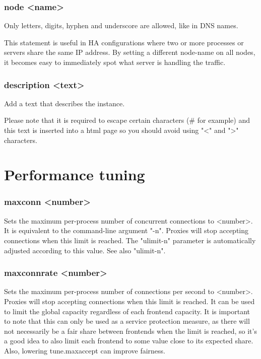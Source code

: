 \subsubsection[node]{node <name>}
  Only letters, digits, hyphen and underscore are allowed, like in DNS names.

  This statement is useful in HA configurations where two or more processes or
  servers share the same IP address. By setting a different node-name on all
  nodes, it becomes easy to immediately spot what server is handling the
  traffic.

\subsubsection[description]{description <text>}
  Add a text that describes the instance.

  Please note that it is required to escape certain characters (\# for example)
  and this text is inserted into a html page so you should avoid using
  "<" and ">" characters.

\section{Performance tuning}

\subsubsection[maxconn]{maxconn <number>}
  Sets the maximum per-process number of concurrent connections to <number>. It
  is equivalent to the command-line argument "-n". Proxies will stop accepting
  connections when this limit is reached. The "ulimit-n" parameter is
  automatically adjusted according to this value. See also "ulimit-n".

\subsubsection[maxconnrate]{maxconnrate <number>}
  Sets the maximum per-process number of connections per second to <number>.
  Proxies will stop accepting connections when this limit is reached. It can be
  used to limit the global capacity regardless of each frontend capacity. It is
  important to note that this can only be used as a service protection measure,
  as there will not necessarily be a fair share between frontends when the
  limit is reached, so it's a good idea to also limit each frontend to some
  value close to its expected share. Also, lowering tune.maxaccept can improve
  fairness.

